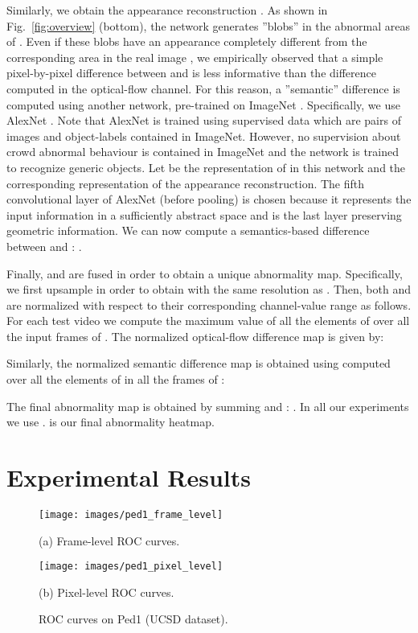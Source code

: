 \documentclass{article}
\begin{document}
	Similarly, we obtain the appearance reconstruction .
	As shown in Fig.~\ref{fig:overview} (bottom), the network generates ''blobs'' in the abnormal areas of 
	. Even if these blobs have an appearance completely different from the corresponding area in the real image ,
	we empirically observed that a simple pixel-by-pixel difference between  and  is less informative than the difference computed in the optical-flow channel. For this reason, a ''semantic'' difference is computed using another network, pre-trained on ImageNet \cite{russakovsky2015imagenet}.
	Specifically, we use AlexNet \cite{alexnet}. Note that AlexNet is trained using supervised data which are pairs of images and object-labels contained in ImageNet. However, no supervision about crowd abnormal behaviour is contained in ImageNet and the network is trained to recognize generic objects.
	Let  be the  representation of  in this network and  the corresponding representation of the appearance reconstruction. The fifth convolutional layer of AlexNet (before pooling) is chosen because it represents the input information in a sufficiently abstract space and is the last layer preserving geometric information. We can now compute a semantics-based difference between  and : .
	
	Finally,  and  are fused in order to obtain a unique abnormality map. Specifically, we first upsample  in order to obtain  with the same resolution as . Then, both  and  are normalized with respect to their corresponding channel-value range as follows. For each test video 
	we compute the maximum value  of all the elements of  over all the input frames of . The normalized optical-flow difference map is given by:
	
	\noindent
	Similarly, the normalized semantic difference map  is obtained using  computed over all the elements of  in all the frames of :

	The final abnormality map is obtained by summing  and : . 
	In all our experiments we use .  is our final abnormality heatmap.
	\section{Experimental Results}
	\label{sec:exp}
	\begin{figure}
		


\begin{minipage}[b]{.49\linewidth}
			\centering
			\centerline{\texttt{[image: images/ped1\_frame\_level]}}
\centerline{\scriptsize(a) Frame-level ROC curves.}\medskip
		\end{minipage}
		\hfill
		\begin{minipage}[b]{0.49\linewidth}
			\centering
			\centerline{\texttt{[image: images/ped1\_pixel\_level]}}
\centerline{\scriptsize(b) Pixel-level ROC curves.}\medskip
		\end{minipage}
\caption{ROC curves on Ped1 (UCSD dataset).}
		\label{fig:rocfrm}
\end{figure}
	
\end{document}
